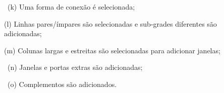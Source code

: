 \begin{description}
    \item[] \, (k) Uma forma de conexão é selecionada;
    
    \item[] \; (l) Linhas pares/ímpares são selecionadas e sub-grades diferentes são adicionadas;
    
    \item[] (m) Colunas largas e estreitas são selecionadas para adicionar janelas;
    
    \item[] \, (n) Janelas e portas extras são adicionadas;
    
    \item[] \, (o) Complementos são adicionados.
\end{description}

\begin{figure}[h!]
	\centering
	\captionsetup{width=15cm}
	{}	
\end{figure}

\begin{figure}[h!]
	\centering
	\captionsetup{width=15cm}
	{}	
\end{figure}

